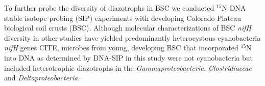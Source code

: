 To further probe the diversity of diazotrophs in BSC we conducted $^{15}$N DNA stable isotope probing (SIP) experiments with developing Colorado Plateau biological soil crusts (BSC). Although molecular characterizations of BSC \textit{nifH} diversity in other studies have yielded predominantly heterocystous cyanobacteria \textit{nifH} genes CITE, microbes from young, developing BSC that incorporated $^{15}$N into DNA as determined by DNA-SIP in this study were not cyanobacteria but included heterotrophic diazotrophs in the \textit{Gammaproteobacteria}, \textit{Clostridiaceae} and \textit{Deltaproteobacteria}.


